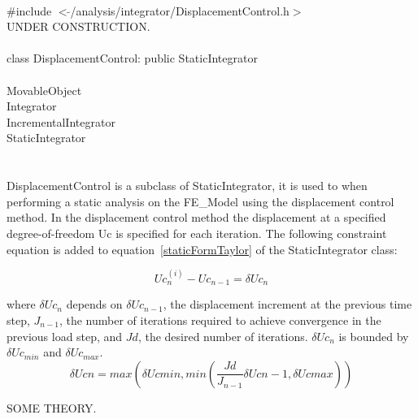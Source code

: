 
   \\
\indent \#include $<\tilde{ }$/analysis/integrator/DisplacementControl.h$>$  \\

UNDER CONSTRUCTION.\\

  \\
\indent class DisplacementControl: public StaticIntegrator  \\

 \\
\indent MovableObject \\
\indent\indent Integrator \\
\indent\indent\indent IncrementalIntegrator \\
\indent\indent\indent\indent StaticIntegrator \\
\indent\indent\indent\indent{} \\

 \\ 
\indent DisplacementControl is a subclass of StaticIntegrator, it is
used to when performing a static analysis on the FE\_Model using the
displacement control method. In the displacement control method the
displacement at a specified degree-of-freedom Uc is specified for each
iteration. The following constraint equation is added to
equation~\ref{staticFormTaylor} of the StaticIntegrator class: 

\[ 
Uc_n^{(i)} - Uc_{n-1} = \delta Uc_n
\]

\noindent where $\delta Uc_n$ depends on $\delta Uc_{n-1}$,
the displacement increment at the previous time step, $J_{n-1}$,
the number of iterations required to achieve convergence in the
previous load step, and $Jd$, the desired number of iterations. $\delta
Uc_n$ is bounded by $\delta Uc_{min}$  and $\delta Uc_{max}$. \\


\[ 
\delta Ucn = max \left( \delta Uc{min}, min \left(
\frac{Jd}{J_{n-1}} \delta Uc{n-1}, \delta Uc{max} \right) \right)
\]

SOME THEORY.\\

